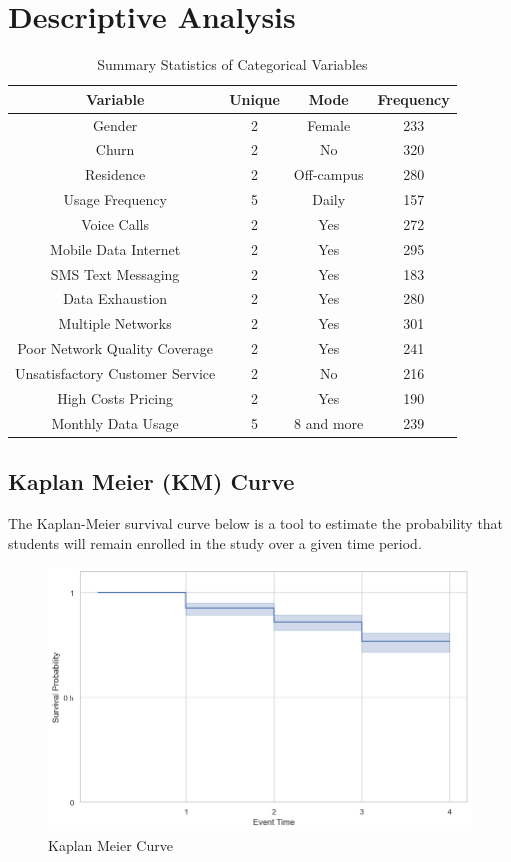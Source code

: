 \documentclass[doublespacing]{report} [12px]%
\begin{document}
\section{Descriptive Analysis}
\begin{table}[H]
\centering
\begin{tabular}{cccc}
\hline
\textbf{Variable} & \textbf{Unique} & \textbf{Mode}& \textbf{Frequency} \\
\hline
Gender & 2 & Female & 233 \\
Churn & 2 & No & 320 \\
Residence & 2 & Off-campus & 280 \\
Usage Frequency & 5 & Daily & 157 \\
Voice Calls & 2 & Yes & 272 \\
Mobile Data Internet & 2 & Yes & 295 \\
SMS Text Messaging & 2 & Yes & 183 \\
Data Exhaustion & 2 & Yes & 280 \\
Multiple Networks & 2 & Yes & 301 \\
Poor Network Quality Coverage & 2 & Yes & 241 \\
Unsatisfactory Customer Service & 2 & No & 216 \\
High Costs Pricing & 2 & Yes & 190 \\
Monthly Data Usage & 5 & 8 and more & 239 \\
\hline
\end{tabular}
\caption{Summary Statistics of Categorical Variables}
\label{table:summary_statistics}
\end{table}



\subsection{Kaplan Meier (KM) Curve}

The Kaplan-Meier survival curve below is a tool to estimate the probability that students will remain enrolled in the study over a given time period. 
\begin{figure}[H]
    \centering
    \includegraphics[width=1\linewidth]{Figure 4/4.1.png}
    \caption{Kaplan Meier Curve}
\end{figure}
\end{document}
